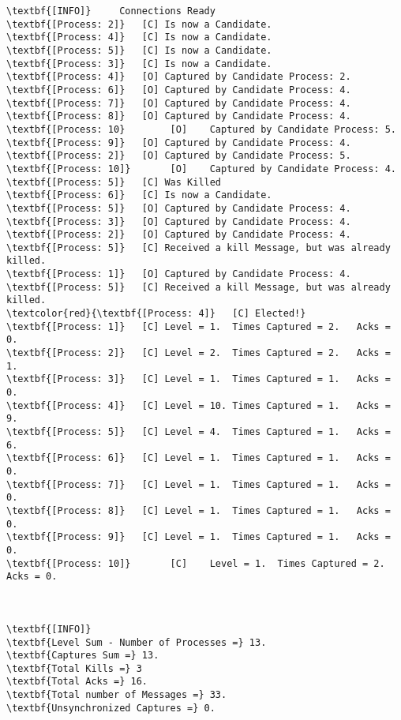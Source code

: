 	\begin{Verbatim}[commandchars=\\\{\},codes={\catcode`$=3\catcode`_=8},frame=single,label=Test 4 output]
\textbf{[INFO]}	  	Connections Ready
\textbf{[Process: 2]}	[C]	Is now a Candidate.
\textbf{[Process: 4]}	[C]	Is now a Candidate.
\textbf{[Process: 5]}	[C]	Is now a Candidate.
\textbf{[Process: 3]}	[C]	Is now a Candidate.
\textbf{[Process: 4]}	[O]	Captured by Candidate Process: 2.
\textbf{[Process: 6]}	[O]	Captured by Candidate Process: 4.
\textbf{[Process: 7]}	[O]	Captured by Candidate Process: 4.
\textbf{[Process: 8]}	[O]	Captured by Candidate Process: 4.
\textbf{[Process: 10}        [O]	Captured by Candidate Process: 5.
\textbf{[Process: 9]}	[O]	Captured by Candidate Process: 4.
\textbf{[Process: 2]}	[O]	Captured by Candidate Process: 5.
\textbf{[Process: 10]}       [O]	Captured by Candidate Process: 4.
\textbf{[Process: 5]}	[C]	Was Killed
\textbf{[Process: 6]}	[C]	Is now a Candidate.
\textbf{[Process: 5]}	[O]	Captured by Candidate Process: 4.
\textbf{[Process: 3]}	[O]	Captured by Candidate Process: 4.
\textbf{[Process: 2]}	[O]	Captured by Candidate Process: 4.
\textbf{[Process: 5]}	[C]	Received a kill Message, but was already killed.
\textbf{[Process: 1]}	[O]	Captured by Candidate Process: 4.
\textbf{[Process: 5]}	[C]	Received a kill Message, but was already killed.
\textcolor{red}{\textbf{[Process: 4]}	[C]	Elected!} 
\textbf{[Process: 1]}	[C]	Level = 1.  Times Captured = 2.   Acks = 0.
\textbf{[Process: 2]}	[C]	Level = 2.  Times Captured = 2.   Acks = 1.
\textbf{[Process: 3]}	[C]	Level = 1.  Times Captured = 1.   Acks = 0.
\textbf{[Process: 4]}	[C]	Level = 10. Times Captured = 1.   Acks = 9.
\textbf{[Process: 5]}	[C]	Level = 4.  Times Captured = 1.   Acks = 6.
\textbf{[Process: 6]}	[C]	Level = 1.  Times Captured = 1.   Acks = 0.
\textbf{[Process: 7]}	[C]	Level = 1.  Times Captured = 1.   Acks = 0.
\textbf{[Process: 8]}	[C]	Level = 1.  Times Captured = 1.   Acks = 0.
\textbf{[Process: 9]}	[C]	Level = 1.  Times Captured = 1.   Acks = 0.
\textbf{[Process: 10]}       [C]	Level = 1.  Times Captured = 2.   Acks = 0.



\textbf{[INFO]}			
\textbf{Level Sum - Number of Processes =} 13.	
\textbf{Captures Sum =} 13.	
\textbf{Total Kills =} 3	
\textbf{Total Acks =} 16.
\textbf{Total number of Messages =} 33.
\textbf{Unsynchronized Captures =} 0.
	\end{Verbatim}

	\vspace{10pt}

